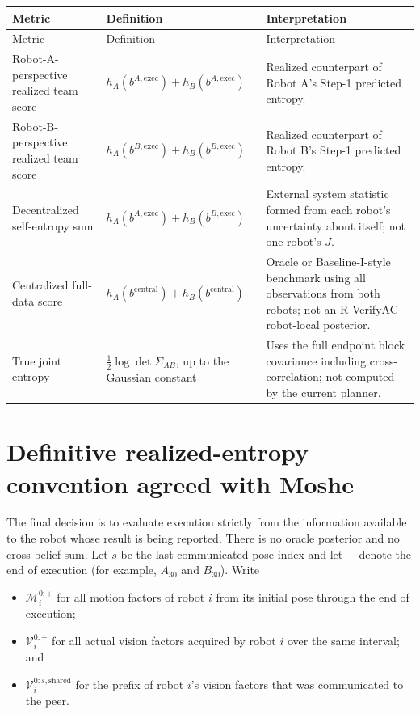 \documentclass[11pt,a4paper]{article}
\newcommand{\hpose}[2]{h_{#1}\!\left(b^{#2}\right)}
\begin{document}
\begin{longtable}{>{\raggedright\arraybackslash}p{}
                  >{\raggedright\arraybackslash}p{}
                  >{\raggedright\arraybackslash}p{}}
\toprule
Metric & Definition & Interpretation \\
\midrule
\endfirsthead
\toprule
Metric & Definition & Interpretation \\
\midrule
\endhead
\bottomrule
\endlastfoot
Robot-A-perspective realized team score &
$\hpose{A}{A,\mathrm{exec}}+\hpose{B}{A,\mathrm{exec}}$ &
Realized counterpart of Robot A's Step-1 predicted entropy. \\

Robot-B-perspective realized team score &
$\hpose{A}{B,\mathrm{exec}}+\hpose{B}{B,\mathrm{exec}}$ &
Realized counterpart of Robot B's Step-1 predicted entropy. \\

Decentralized self-entropy sum &
$\hpose{A}{A,\mathrm{exec}}+\hpose{B}{B,\mathrm{exec}}$ &
External system statistic formed from each robot's uncertainty about itself;
not one robot's $J$. \\

Centralized full-data score &
$h_A(b^{\mathrm{central}})+h_B(b^{\mathrm{central}})$ &
Oracle or Baseline-I-style benchmark using all observations from both robots;
not an R-VerifyAC robot-local posterior. \\

True joint entropy &
$\tfrac12\log\det\Sigma_{AB}$, up to the Gaussian constant &
Uses the full endpoint block covariance including cross-correlation; not
computed by the current planner. \\
\end{longtable}

\section{Definitive realized-entropy convention agreed with Moshe}

The final decision is to evaluate execution strictly from the information
available to the robot whose result is being reported.  There is no oracle
posterior and no cross-belief sum.  Let $s$ be the last communicated pose index
and let $+$ denote the end of execution (for example, $A_{30}$ and $B_{30}$).
Write
\begin{itemize}
  \item $\mathcal M_i^{0:+}$ for all motion factors of robot $i$ from its
        initial pose through the end of execution;
  \item $\mathcal V_i^{0:+}$ for all actual vision factors acquired by robot
        $i$ over the same interval; and
  \item $\mathcal V_i^{0:s,\mathrm{shared}}$ for the prefix of robot $i$'s
        vision factors that was communicated to the peer.
\end{itemize}
\end{document}
